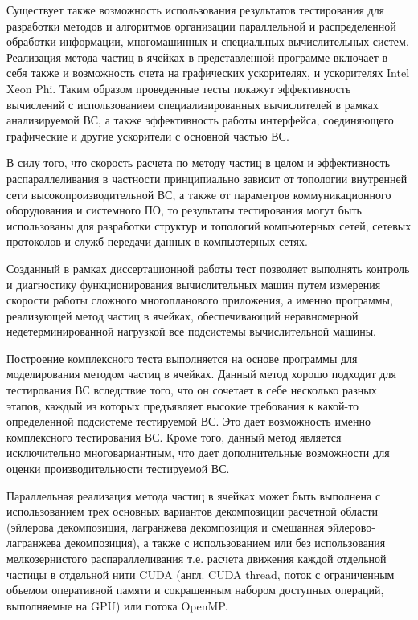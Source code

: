 Существует также возможность использования результатов тестирования для разработки методов и алгоритмов организации параллельной и распределенной обработки информации, многомашинных и специальных вычислительных систем. Реализация
метода частиц в ячейках в представленной программе включает в себя также и возможность счета на графических ускорителях, и ускорителях Intel Xeon Phi. Таким образом проведенные тесты покажут эффективность вычислений с использованием специализированных вычислителей в рамках анализируемой ВС, а также эффективность работы интерфейса, соединяющего графические и другие ускорители с основной частью ВС.

В силу того, что скорость расчета по методу частиц в целом и эффективность распараллеливания в частности принципиально зависит от топологии внутренней сети высокопроизводительной ВС, а также от параметров коммуникационного оборудования и системного ПО, то результаты тестирования могут быть использованы для разработки структур и топологий компьютерных сетей, сетевых протоколов и служб передачи данных в компьютерных сетях.

Созданный в рамках диссертационной работы тест позволяет выполнять контроль и диагностику функционирования вычислительных машин путем измерения скорости работы сложного многопланового приложения, а именно программы, реализующей метод частиц в ячейках, обеспечивающий неравномерной недетерминированной нагрузкой все подсистемы вычислительной машины.

{\methods} Построение комплексного теста выполняется на основе программы для моделирования методом частиц в ячейках. Данный метод хорошо подходит для тестирования ВС вследствие того, что он сочетает в себе несколько разных этапов, каждый из которых предъявляет высокие требования к какой-то определенной подсистеме тестируемой ВС. Это дает возможность именно комплексного тестирования ВС. Кроме того, данный метод является исключительно многовариантным, что дает дополнительные возможности  для оценки производительности тестируемой ВС.

Параллельная реализация метода частиц в ячейках может быть выполнена с использованием трех основных вариантов декомпозиции расчетной области (эйлерова декомпозиция, лагранжева декомпозиция и смешанная эйлерово-лагранжева декомпозиция), а также с использованием или без использования мелкозернистого распараллеливания т.е. расчета движения каждой отдельной частицы в отдельной нити CUDA (англ. CUDA thread, поток с ограниченным объемом оперативной памяти и сокращенным набором доступных операций, выполняемые на GPU) или потока OpenMP. 

